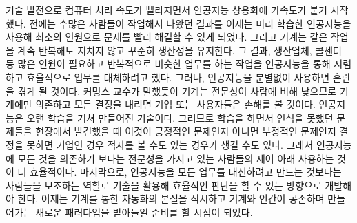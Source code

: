 \documentclass[smallextended]{svjour3}       %
\begin{document}
기술 발전으로 컴퓨터 처리 속도가 빨라지면서 인공지능 상용화에 가속도가
붙기 시작했다. 전에는 수많은 사람들이 작업해서 나왔던 결과를 이제는 미리
학습한 인공지능을 사용해 최소의 인원으로 문제를 빨리 해결할 수 있게
되었다. 그리고 기계는 같은 작업을 계속 반복해도 지치지 않고 꾸준히
생산성을 유지한다. 그 결과, 생산업체, 콜센터 등 많은 인원이 필요하고
반복적으로 비슷한 업무를 하는 작업을 인공지능을 통해 저렴하고 효율적으로
업무를 대체하려고 했다. 그러나, 인공지능을 분별없이 사용하면 혼란을 겪게
될 것이다. 커밍스 교수가 말했듯이 기계는 전문성이 사람에 비해 낮으므로
기계에만 의존하고 모든 결정을 내리면 기업 또는 사용자들은 손해를 볼
것이다. 인공지능은 오랜 학습을 거쳐 만들어진 기술이다. 그러므로 학습을
하면서 인식을 못했던 문제들을 현장에서 발견했을 때 이것이 긍정적인
문제인지 아니면 부정적인 문제인지 결정을 못하면 기업인 경우 적자를 볼
수도 있는 경우가 생길 수도 있다. 그래서 인공지능에 모든 것을 의존하기
보다는 전문성을 가지고 있는 사람들의 제어 아래 사용하는 것이 더
효율적이다. 마지막으로, 인공지능을 모든 업무를 대신하려고 만드는
것보다는 사람들을 보조하는 역할로 기술을 활용해 효율적인 판단을 할 수
있는 방향으로 개발해야 한다. 이제는 기계를 통한 자동화의 본질을 직시하고
기계와 인간이 공존하며 만들어가는 새로운 패러다임을 받아들일 준비를 할
시점이 되었다.



\end{document}
